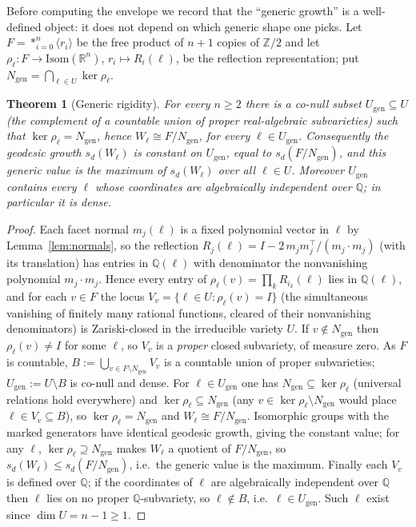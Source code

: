 \documentclass[11pt]{article}
\newcommand{\Z}{\mathbb{Z}}
\newcommand{\R}{\mathbb{R}}
\newcommand{\Q}{\mathbb{Q}}
\newtheorem{theorem}{Theorem}
\theoremstyle{definition}
\begin{document}
Before computing the envelope we record that the ``generic growth'' is a well-defined object: it does
not depend on which generic shape one picks. Let $F=\ast_{i=0}^{n}\langle r_i\rangle$ be the free
product of $n+1$ copies of $\Z/2$ and let $\rho_\ell\colon F\to\mathrm{Isom}(\R^n)$, $r_i\mapsto
R_i(\ell)$, be the reflection representation; put $N_{\mathrm{gen}}=\bigcap_{\ell\in U}\ker\rho_\ell$.

\begin{theorem}[Generic rigidity]
\label{thm:rigidity}
For every $n\ge2$ there is a co-null subset $U_{\mathrm{gen}}\subseteq U$ (the complement of a
countable union of proper real-algebraic subvarieties) such that $\ker\rho_\ell=N_{\mathrm{gen}}$,
hence $W_\ell\cong F/N_{\mathrm{gen}}$, for every $\ell\in U_{\mathrm{gen}}$. Consequently the geodesic
growth $s_d(W_\ell)$ is constant on $U_{\mathrm{gen}}$, equal to $s_d(F/N_{\mathrm{gen}})$, and this
generic value is the maximum of $s_d(W_\ell)$ over all $\ell\in U$. Moreover $U_{\mathrm{gen}}$ contains
every $\ell$ whose coordinates are algebraically independent over $\Q$; in particular it is dense.
\end{theorem}

\begin{proof}
Each facet normal $m_j(\ell)$ is a fixed polynomial vector in $\ell$ by Lemma~\ref{lem:normals}, so the
reflection $R_j(\ell)=I-2\,m_jm_j^{\!\top}/(m_j\!\cdot\!m_j)$ (with its translation) has entries in
$\Q(\ell)$ with denominator the nonvanishing polynomial $m_j\!\cdot\!m_j$. Hence every entry of
$\rho_\ell(v)=\prod_k R_{i_k}(\ell)$ lies in $\Q(\ell)$, and for each $v\in F$ the locus
$V_v=\{\ell\in U:\rho_\ell(v)=I\}$ (the simultaneous vanishing of finitely many rational functions,
cleared of their nonvanishing denominators) is Zariski-closed in the irreducible variety $U$. If
$v\notin N_{\mathrm{gen}}$ then $\rho_\ell(v)\ne I$ for some $\ell$, so $V_v$ is a \emph{proper} closed
subvariety, of measure zero. As $F$ is countable,
$B:=\bigcup_{v\in F\setminus N_{\mathrm{gen}}}V_v$ is a countable union of proper subvarieties;
$U_{\mathrm{gen}}:=U\setminus B$ is co-null and dense. For $\ell\in U_{\mathrm{gen}}$ one has
$N_{\mathrm{gen}}\subseteq\ker\rho_\ell$ (universal relations hold everywhere) and
$\ker\rho_\ell\subseteq N_{\mathrm{gen}}$ (any $v\in\ker\rho_\ell\setminus N_{\mathrm{gen}}$ would place
$\ell\in V_v\subseteq B$), so $\ker\rho_\ell=N_{\mathrm{gen}}$ and $W_\ell\cong F/N_{\mathrm{gen}}$.
Isomorphic groups with the marked generators have identical geodesic growth, giving the constant value;
for any $\ell$, $\ker\rho_\ell\supseteq N_{\mathrm{gen}}$ makes $W_\ell$ a quotient of
$F/N_{\mathrm{gen}}$, so $s_d(W_\ell)\le s_d(F/N_{\mathrm{gen}})$, i.e.\ the generic value is the maximum.
Finally each $V_v$ is defined over $\Q$; if the coordinates of $\ell$ are algebraically independent over
$\Q$ then $\ell$ lies on no proper $\Q$-subvariety, so $\ell\notin B$, i.e.\ $\ell\in U_{\mathrm{gen}}$.
Such $\ell$ exist since $\dim U=n-1\ge1$.
\end{proof}
\end{document}
